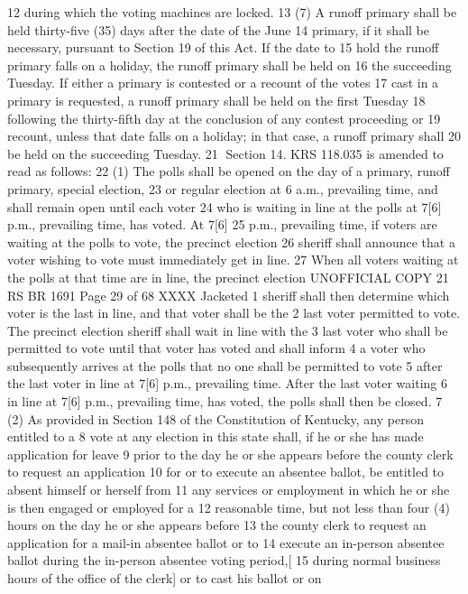 12 during which the voting machines are locked.
13 (7) A runoff primary shall be held thirty-five (35) days after the date of the June
14 primary, if it shall be necessary, pursuant to Section 19 of this Act. If the date to
15 hold the runoff primary falls on a holiday, the runoff primary shall be held on
16 the succeeding Tuesday. If either a primary is contested or a recount of the votes
17 cast in a primary is requested, a runoff primary shall be held on the first Tuesday
18 following the thirty-fifth day at the conclusion of any contest proceeding or
19 recount, unless that date falls on a holiday; in that case, a runoff primary shall
20 be held on the succeeding Tuesday.
21 Section 14. KRS 118.035 is amended to read as follows:
22 (1) The polls shall be opened on the day of a primary, runoff primary, special election,
23 or regular election at 6 a.m., prevailing time, and shall remain open until each voter
24 who is waiting in line at the polls at 7[6] p.m., prevailing time, has voted. At 7[6]
25 p.m., prevailing time, if voters are waiting at the polls to vote, the precinct election
26 sheriff shall announce that a voter wishing to vote must immediately get in line.
27 When all voters waiting at the polls at that time are in line, the precinct election 
UNOFFICIAL COPY 21 RS BR 1691
Page 29 of 68
XXXX Jacketed
1 sheriff shall then determine which voter is the last in line, and that voter shall be the
2 last voter permitted to vote. The precinct election sheriff shall wait in line with the
3 last voter who shall be permitted to vote until that voter has voted and shall inform
4 a voter who subsequently arrives at the polls that no one shall be permitted to vote
5 after the last voter in line at 7[6] p.m., prevailing time. After the last voter waiting
6 in line at 7[6] p.m., prevailing time, has voted, the polls shall then be closed.
7 (2) As provided in Section 148 of the Constitution of Kentucky, any person entitled to a
8 vote at any election in this state shall, if he or she has made application for leave
9 prior to the day he or she appears before the county clerk to request an application
10 for or to execute an absentee ballot, be entitled to absent himself or herself from
11 any services or employment in which he or she is then engaged or employed for a
12 reasonable time, but not less than four (4) hours on the day he or she appears before
13 the county clerk to request an application for a mail-in absentee ballot or to
14 execute an in-person absentee ballot during the in-person absentee voting period,[
15 during normal business hours of the office of the clerk] or to cast his ballot or on
